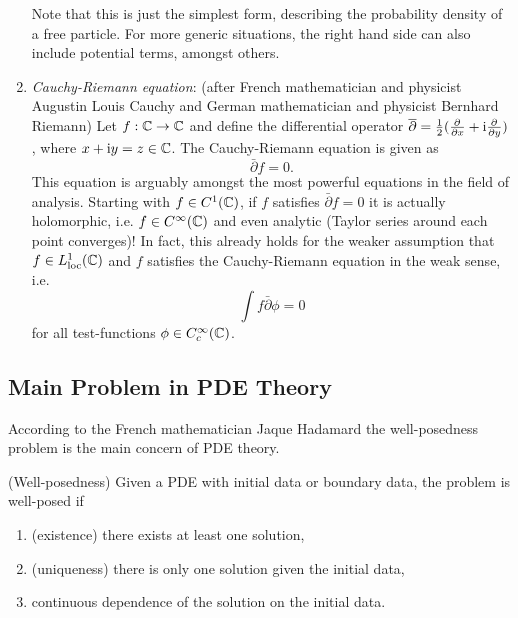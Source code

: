 \documentclass[11pt]{article}
\begin{document}
\begin{eg}
\begin{enumerate}
\begin{equation*}
				\end{equation*}
				Note that this is just the simplest form, describing the probability density of a free particle. For more generic situations, the right hand side can also include potential terms, amongst others.
				\item \textit{Cauchy-Riemann equation}: (after French mathematician and physicist Augustin Louis Cauchy and German mathematician and physicist Bernhard Riemann) Let $f:\CC\rightarrow\CC$ and define the differential operator $\bar{\partial}=\frac{1}{2}(\del[]{}{x}+\mathrm{i}\del[]{}{y})$, where $x+\mathrm{i}y=z\in\CC$. The Cauchy-Riemann equation is given as
				\begin{equation*}
					\bar{\partial}f=0.
				\end{equation*}
				This equation is arguably amongst the most powerful equations in the field of analysis. Starting with $f\in C^1(\CC)$, if $f$ satisfies $\bar{\partial}f=0$ it is actually holomorphic, i.e. $f\in C^\infty(\CC)$ and even analytic (Taylor series around each point converges)! In fact, this already holds for the weaker assumption that $f\in L^1_{\mathrm{loc}}(\CC)$ and $f$ satisfies the Cauchy-Riemann equation in the weak sense, i.e.
				\begin{equation*}
					\int f\bar{\partial}\phi=0
				\end{equation*}
				for all test-functions $\phi\in C^\infty_{c}(\CC)$.
			\end{enumerate}
		\end{eg}


		\subsection{Main Problem in PDE Theory}

				According to the French mathematician Jaque Hadamard the well-posedness problem is the main concern of PDE theory.

				\begin{defi}
					(Well-posedness) Given a PDE with initial data or boundary data, the problem is well-posed if
					\begin{enumerate}
						\item (existence) there exists at least one solution,
						\item (uniqueness) there is only one solution given the initial data,
						\item continuous dependence of the solution on the initial data. 
					\end{enumerate}
				\end{defi}
\end{document}
